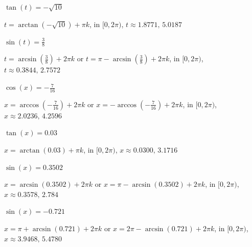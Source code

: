 \documentclass{ximera}
\begin{document}
\begin{question}
\begin{problem}
$\tan(t) = -\sqrt{10}$

\begin{solution}
$t = \arctan\left(-\sqrt{10}\right) + \pi k$, in  $[0, 2\pi)$, $t \approx 1.8771, \, 5.0187$
\end{solution}
\end{problem}

\begin{problem}
$\sin(t) = \frac{3}{8}$

\begin{solution}
$t = \arcsin\left(\frac{3}{8}\right) + 2\pi k$ or $t = \pi - \arcsin\left(\frac{3}{8}\right) + 2\pi k$, in  $[0, 2\pi)$, $t \approx 0.3844, \, 2.7572$
\end{solution}
\end{problem}

\begin{problem}
$\cos(x) = -\frac{7}{16}$

\begin{solution}
$x =  \arccos\left(-\frac{7}{16}\right) + 2\pi k$ or $x = - \arccos\left(-\frac{7}{16}\right) + 2\pi k$, in  $[0, 2\pi)$, $x \approx 2.0236, \, 4.2596$
\end{solution}
\end{problem}

\begin{problem}
$\tan(x) = 0.03$

\begin{solution}
$x = \arctan(0.03) + \pi k$, in  $[0, 2\pi)$, $x \approx 0.0300, \, 3.1716$
\end{solution}
\end{problem}

\begin{problem}
$\sin(x) = 0.3502$

\begin{solution}
$x = \arcsin(0.3502) + 2\pi k$ or $x = \pi - \arcsin(0.3502) + 2\pi k$, in  $[0, 2\pi)$, $x \approx 0.3578, \,2.784$
\end{solution}
\end{problem}

\begin{problem}
$\sin(x) = -0.721$

\begin{solution}
$x = \pi + \arcsin(0.721) + 2\pi k$ or $x = 2\pi - \arcsin(0.721) + 2\pi k$, in  $[0, 2\pi)$, $x \approx 3.9468, \, 5.4780$
\end{solution}
\end{problem}


\end{question}
\end{document}
